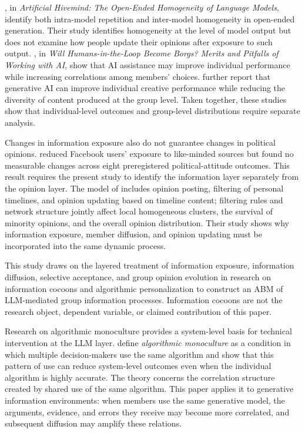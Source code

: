 \documentclass[11pt,a4paper]{article}
\newcommand{\term}[1]{\textit{#1}}
\begin{document}
\citet{jiang2025}, in \emph{Artificial Hivemind: The Open-Ended Homogeneity of Language Models}, identify both intra-model repetition and inter-model homogeneity in open-ended generation. Their study identifies homogeneity at the level of model output but does not examine how people update their opinions after exposure to such output. \citet{fugener2021}, in \emph{Will Humans-in-the-Loop Become Borgs? Merits and Pitfalls of Working with AI}, show that AI assistance may improve individual performance while increasing correlations among members' choices. \citet{doshi2024} further report that generative AI can improve individual creative performance while reducing the diversity of content produced at the group level. Taken together, these studies show that individual-level outcomes and group-level distributions require separate analysis.

Changes in information exposure also do not guarantee changes in political opinions. \citet{nyhan2023} reduced Facebook users' exposure to like-minded sources but found no measurable changes across eight preregistered political-attitude outcomes. This result requires the present study to identify the information layer separately from the opinion layer. The model of \citet{perra2019} includes opinion posting, filtering of personal timelines, and opinion updating based on timeline content; filtering rules and network structure jointly affect local homogeneous clusters, the survival of minority opinions, and the overall opinion distribution. Their study shows why information exposure, member diffusion, and opinion updating must be incorporated into the same dynamic process.

This study draws on the layered treatment of information exposure, information diffusion, selective acceptance, and group opinion evolution in research on information cocoons and algorithmic personalization to construct an ABM of LLM-mediated group information processes. Information cocoons are not the research object, dependent variable, or claimed contribution of this paper.

Research on algorithmic monoculture provides a system-level basis for technical intervention at the LLM layer. \citet{kleinberg2021} define \term{algorithmic monoculture} as a condition in which multiple decision-makers use the same algorithm and show that this pattern of use can reduce system-level outcomes even when the individual algorithm is highly accurate. The theory concerns the correlation structure created by shared use of the same algorithm. This paper applies it to generative information environments: when members use the same generative model, the arguments, evidence, and errors they receive may become more correlated, and subsequent diffusion may amplify these relations.
\end{document}

